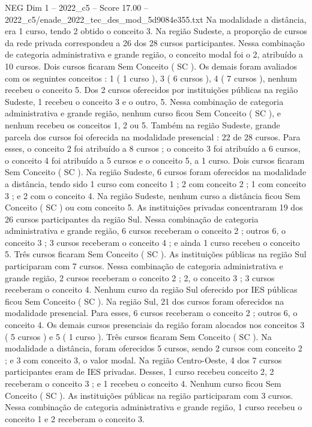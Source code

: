 \begin{textsample}{NEG Dim 1 – 2022\_c5 – Score 17.00 – 2022\_c5/enade\_2022\_tec\_des\_mod\_5d9084e355.txt}
Na modalidade a distância, era 1 curso, tendo 2 obtido o conceito 3.
Na região Sudeste, a proporção de cursos da rede privada correspondeu a 26 dos 28 cursos participantes.
Nessa combinação de categoria administrativa e grande região, o conceito modal foi o 2, atribuído a 10 cursos.
Dois cursos ficaram Sem Conceito ( SC ).
Os demais foram avaliados com os seguintes conceitos : 1 ( 1 curso ), 3 ( 6 cursos ), 4 ( 7 cursos ), nenhum recebeu o conceito 5.
Dos 2 cursos oferecidos por instituições públicas na região Sudeste, 1 recebeu o conceito 3 e o outro, 5.
Nessa combinação de categoria administrativa e grande região, nenhum curso ficou Sem Conceito ( SC ), e nenhum recebeu os conceitos 1, 2 ou 5.
Também na região Sudeste, grande parcela dos cursos foi oferecida na modalidade presencial : 22 de 28 cursos.
Para esses, o conceito 2 foi atribuído a 8 cursos ; o conceito 3 foi atribuído a 6 cursos, o conceito 4 foi atribuído a 5 cursos e o conceito 5, a 1 curso.
Dois cursos ficaram Sem Conceito ( SC ).
Na região Sudeste, 6 cursos foram oferecidos na modalidade a distância, tendo sido 1 curso com conceito 1 ; 2 com conceito 2 ; 1 com conceito 3 ; e 2 com o conceito 4.
Na região Sudeste, nenhum curso a distância ficou Sem Conceito ( SC ) ou com conceito 5.
As instituições privadas concentraram 19 dos 26 cursos participantes da região Sul.
Nessa combinação de categoria administrativa e grande região, 6 cursos receberam o conceito 2 ; outros 6, o conceito 3 ; 3 cursos receberam o conceito 4 ; e ainda 1 curso recebeu o conceito 5.
Três cursos ficaram Sem Conceito ( SC ).
As instituições públicas na região Sul participaram com 7 cursos.
Nessa combinação de categoria administrativa e grande região, 2 cursos receberam o conceito 2 ; 2, o conceito 3 ; 3 cursos receberam o conceito 4.
Nenhum curso da região Sul oferecido por IES públicas ficou Sem Conceito ( SC ).
Na região Sul, 21 dos cursos foram oferecidos na modalidade presencial.
Para esses, 6 cursos receberam o conceito 2 ; outros 6, o conceito 4.
Os demais cursos presenciais da região foram alocados nos conceitos 3 ( 5 cursos ) e 5 ( 1 curso ).
Três cursos ficaram Sem Conceito ( SC ).
Na modalidade a distância, foram oferecidos 5 cursos, sendo 2 cursos com conceito 2 ; e 3 com conceito 3, o valor modal.
Na região Centro-Oeste, 4 dos 7 cursos participantes eram de IES privadas.
Desses, 1 curso recebeu conceito 2, 2 receberam o conceito 3 ; e 1 recebeu o conceito 4.
Nenhum curso ficou Sem Conceito ( SC ).
As instituições públicas na região participaram com 3 cursos.
Nessa combinação de categoria administrativa e grande região, 1 curso recebeu o conceito 1 e 2 receberam o conceito 3.

\end{textsample}
